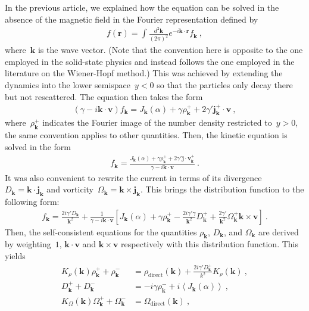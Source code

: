 \documentclass[preprint,aps,eqsecnum]{revtex4-1}
\newcommand{\fplus}[1]{{#1}^{+}}
\newcommand{\fminus}[1]{{#1}^{-}}
\begin{document}
In the previous article, we explained how the equation
can be solved in the absence of the magnetic field in the Fourier
representation defined by
\begin{align}
  f({\bm r}) = \int \frac{d^2 {\bm k}}{(2\pi)^2} e^{-i{\bm k}\cdot{\bm r}}
  f_{\bm k}\ ,
\end{align}
where~${\bm k}$ is the wave vector.
(Note that the convention here is opposite to the one employed in the
solid-state physics and instead follows the one employed in the literature
on the Wiener-Hopf method.)
This was achieved by extending the dynamics into the
lower semispace~$y < 0$ so that the particles only decay there but
not rescattered. The equation then takes the form
\begin{align}
  (\gamma - i {\bm k} \cdot {\bm v}) f_{\bm k} =
  J_{\bm k}(\alpha) + \gamma \fplus{\rho}_{\bm k}
  + 2\gamma' \fplus{\bm j}_{\bm k}
  \cdot {\bm v}\ , 
\end{align}
where~$\fplus{\rho}_{\bm k}$ indicates the Fourier image of
the number density restricted to~$y > 0$, the same convention
applies to other quantities. 
Then, the kinetic equation is solved in the form
\begin{align}
  f_{\bm k} = \frac{J_{\bm k}(\alpha) + \gamma \fplus{\rho}_{\bm k}
    + 2\gamma' \fplus{{\bm j}\cdot{\bm v}}_{\bm k}}{\gamma - i {\bm k} \cdot {\bm v}}\ . 
\end{align}
It was also convenient to rewrite the current in terms of
its divergence~$D_{\bm k} = {\bm k} \cdot {\bm j}_{\bm k}$
and vorticity~$\Omega_{\bm k} = {\bm k} \times {\bm j}_{\bm k}$.
This brings the distribution function to the following form:
\begin{align}
  f_{\bm k} = \frac{2i\gamma' D_{\bm k}}{\bm k^2} +
  \frac{1}{\gamma - i {\bm k} \cdot {\bm v}}
  \left[J_{\bm k}(\alpha) + \gamma \fplus{\rho}_{\bm k}
  - \frac{2i\gamma' \gamma}{{\bm k}^2} \fplus{D}_{\bm k} 
  + \frac{2\gamma'}{\bm k^2} \fplus{\Omega}_{\bm k} {\bm k} \times {\bm v}
  \right]\ . 
\end{align}
Then, the self-consistent equations for the quantities
$\rho_{\bm k}$, $D_{\bm k}$, and $\Omega_{\bm k}$  are
derived by  weighting~$1$, ${\bm k} \cdot{\bm v}$ and ${\bm k}\times{\bm v}$
respectively with this distribution function. This yields
\begin{align}
K_\rho({\bm k}) \fplus{\rho}_{\bm k}
+ \fminus{\rho}_{\bm k} &= \rho_\mathrm{direct}({\bm k})
+ \frac{2 i \gamma' \fplus{D}_{\bm k}}{k^2} K_\rho({\bm k}) \ , \\
\fplus{D}_{\bm k} + \fminus{D}_{\bm k}
&= -i \gamma \fminus{\rho}_{\bm k} + i \left\langle J_{\bm k}(\alpha)
  \right\rangle \ , \\
K_\Omega({\bm k}) \fplus{\Omega}_{\bm k}  + \fminus{\Omega}_{\bm k}
&= \Omega_\mathrm{direct}({\bm k})\ , 
\end{align}
\end{document}
